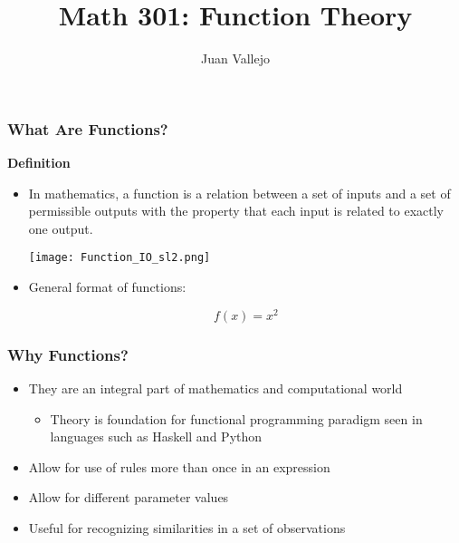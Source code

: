 \documentclass{beamer}
\begin{document}
\begin{frame}
  \title{Math 301: Function Theory}
  \author{Juan Vallejo}
  \maketitle
\end{frame}

\begin{frame}[fragile]\frametitle{What Are Functions?}
\begin{center}\textbf{Definition} \end{center}

\begin{itemize}
  \item In mathematics, a function is a relation between a set of inputs and a set of permissible outputs with the property that each input is related to exactly one output. %
  
  \vfill
  \begin{center}\texttt{[image: Function\_IO\_sl2.png]} \end{center}
  
  \vfill
  \item General format of functions:
  
  \vfill
  \begin{equation*}
    f(x) = x^2
  \end{equation*}
  \vfill

\end{itemize}

\end{frame}

\begin{frame}[fragile]\frametitle{Why Functions?}

\begin{itemize}
  \item They are an integral part of mathematics and computational world
    \begin{itemize}
      \item Theory is foundation for functional programming paradigm seen in languages such as Haskell and Python
    \end{itemize}
  \item Allow for use of rules more than once in an expression
  \item Allow for different parameter values
  \item Useful for recognizing similarities in a set of observations

\end{itemize}

\end{frame}
\end{document}
